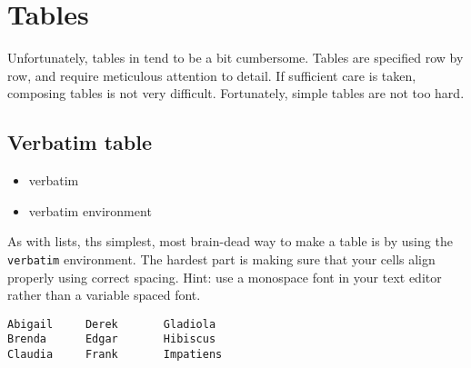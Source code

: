 	
	\section{Tables}
	\label{Tables}

        Unfortunately, tables in \Lx{} tend to be a bit cumbersome. Tables are specified row by row, and require meticulous attention to detail. If sufficient care is taken, composing tables is not very difficult. Fortunately, simple tables are not too hard. 
        
        \subsection{Verbatim table}
        \label{Verbatim table}
        
        \begin{framed}
            \begin{itemize}
                \item{verbatim}
                \item{verbatim environment}
            \end{itemize}
        \end{framed}

        As with lists, ths simplest, most brain-dead way to make a table is by using the \texttt{verbatim} environment. The hardest part is making sure that your cells align properly using correct spacing. Hint: use a monospace font in your text editor rather than a variable spaced font.

        \begin{verbatim}
Abigail     Derek       Gladiola
Brenda      Edgar       Hibiscus
Claudia     Frank       Impatiens
        \end{verbatim}


